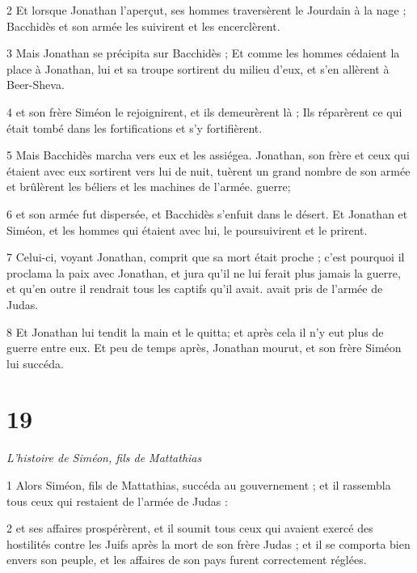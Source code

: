 \par 2 Et lorsque Jonathan l'aperçut, ses hommes traversèrent le Jourdain à la nage ; Bacchidès et son armée les suivirent et les encerclèrent.

\par 3 Mais Jonathan se précipita sur Bacchidès ; Et comme les hommes cédaient la place à Jonathan, lui et sa troupe sortirent du milieu d'eux, et s'en allèrent à Beer-Sheva.

\par 4 et son frère Siméon le rejoignirent, et ils demeurèrent là ; Ils réparèrent ce qui était tombé dans les fortifications et s'y fortifièrent.

\par 5 Mais Bacchidès marcha vers eux et les assiégea. Jonathan, son frère et ceux qui étaient avec eux sortirent vers lui de nuit, tuèrent un grand nombre de son armée et brûlèrent les béliers et les machines de l'armée. guerre;

\par 6 et son armée fut dispersée, et Bacchidès s'enfuit dans le désert. Et Jonathan et Siméon, et les hommes qui étaient avec lui, le poursuivirent et le prirent.

\par 7 Celui-ci, voyant Jonathan, comprit que sa mort était proche ; c'est pourquoi il proclama la paix avec Jonathan, et jura qu'il ne lui ferait plus jamais la guerre, et qu'en outre il rendrait tous les captifs qu'il avait. avait pris de l'armée de Judas.

\par 8 Et Jonathan lui tendit la main et le quitta; et après cela il n'y eut plus de guerre entre eux. Et peu de temps après, Jonathan mourut, et son frère Siméon lui succéda.


\chapter{19}

\par \textit{L'histoire de Siméon, fils de Mattathias}

\par 1 Alors Siméon, fils de Mattathias, succéda au gouvernement ; et il rassembla tous ceux qui restaient de l'armée de Judas :

\par 2 et ses affaires prospérèrent, et il soumit tous ceux qui avaient exercé des hostilités contre les Juifs après la mort de son frère Judas ; et il se comporta bien envers son peuple, et les affaires de son pays furent correctement réglées.

